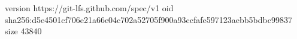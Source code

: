 version https://git-lfs.github.com/spec/v1
oid sha256:d5e4501cf706e21a66e04c702a52705f900a93ccfafe597123aebb5bdbc99837
size 43840
